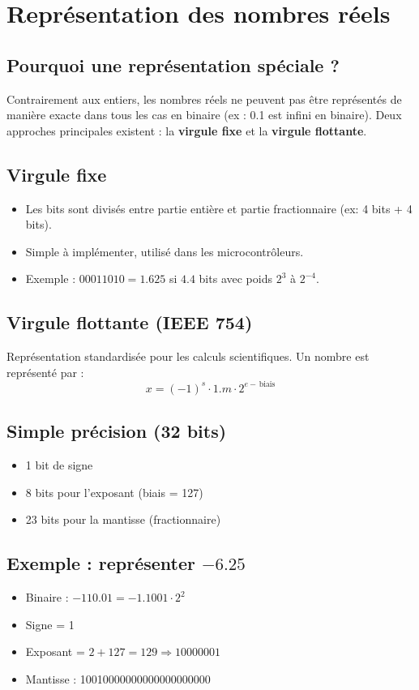 \documentclass[12pt,a4paper]{article}
\begin{document}
\newpage

\section{Représentation des nombres réels}

\subsection{Pourquoi une représentation spéciale ?}
Contrairement aux entiers, les nombres réels ne peuvent pas être représentés de manière exacte dans tous les cas en binaire (ex : 0.1 est infini en binaire). Deux approches principales existent : la \textbf{virgule fixe} et la \textbf{virgule flottante}.

\subsection{Virgule fixe}
\begin{itemize}
    \item Les bits sont divisés entre partie entière et partie fractionnaire (ex: 4 bits + 4 bits).
    \item Simple à implémenter, utilisé dans les microcontrôleurs.
    \item Exemple : $00011010 = 1.625$ si $4.4$ bits avec poids $2^3$ à $2^{-4}$.
\end{itemize}

\subsection{Virgule flottante (IEEE 754)}
Représentation standardisée pour les calculs scientifiques. Un nombre est représenté par :
\[ x = (-1)^s \cdot 1.m \cdot 2^{e - \,\text{biais}} \]

\subsection{Simple précision (32 bits)}
\begin{itemize}
    \item 1 bit de signe
    \item 8 bits pour l'exposant (biais = 127)
    \item 23 bits pour la mantisse (fractionnaire)
\end{itemize}

\subsection{Exemple : représenter $-6.25$}
\begin{itemize}
    \item Binaire : $-110.01 = -1.1001 \cdot 2^2$
    \item Signe = 1
    \item Exposant = $2 + 127 = 129 \Rightarrow 10000001$
    \item Mantisse : 10010000000000000000000
\end{itemize}
\end{document}
